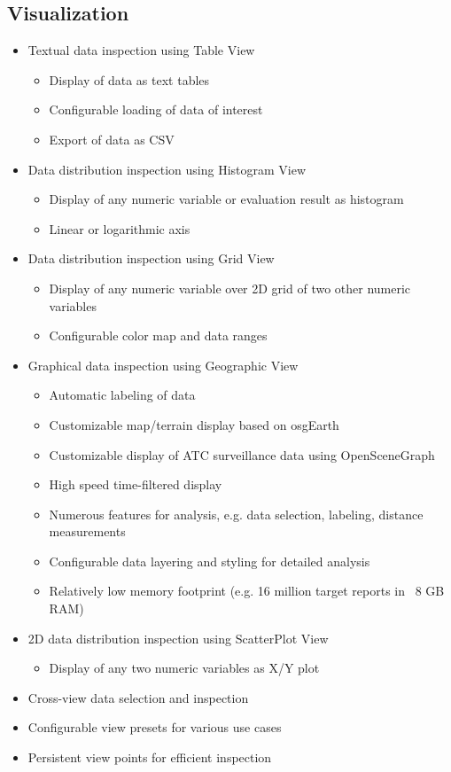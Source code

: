 \subsection{Visualization}
\begin{itemize}  
    \item Textual data inspection using Table View
    \begin{itemize}  
        \item Display of data as text tables
        \item Configurable loading of data of interest
        \item Export of data as CSV
    \end{itemize}
    \item Data distribution inspection using Histogram View
    \begin{itemize}  
        \item Display of any numeric variable or evaluation result as histogram
        \item Linear or logarithmic axis
    \end{itemize}
        \item Data distribution inspection using Grid View
    \begin{itemize}  
        \item Display of any numeric variable over 2D grid of two other numeric variables
        \item Configurable color map and data ranges
    \end{itemize}
    \item Graphical data inspection using Geographic View
    \begin{itemize}  
        \item Automatic labeling of data
        \item Customizable map/terrain display based on osgEarth
        \item Customizable display of ATC surveillance data using OpenSceneGraph
        \item High speed time-filtered display
        \item Numerous features for analysis, e.g. data selection, labeling, distance measurements
        \item Configurable data layering and styling for detailed analysis
        \item Relatively low memory footprint (e.g. 16 million target reports in ~8 GB RAM)
    \end{itemize}    
    \item 2D data distribution inspection using ScatterPlot View
    \begin{itemize}  
        \item Display of any two numeric variables as X/Y plot
    \end{itemize}
    \item Cross-view data selection and inspection
    \item Configurable view presets for various use cases
    \item Persistent view points for efficient inspection
\end{itemize}

